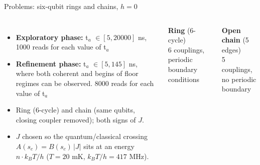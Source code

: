\documentclass[aspectratio=169,11pt]{beamer}
\begin{document}
\begin{frame}{Problems: six-qubit rings and chains, $h=0$}
  \begin{columns}[T]
    \begin{itemize}
    \item \textbf{Exploratory phase:} t$_a$ $\in [5,20000]$ ns, 1000 reads for each value of t$_a$
    \item \textbf{Refinement phase:} t$_a$ $\in [5,145]$ ns, where both coherent and begins of floor regimes can be observed. 8000 reads for each value of t$_a$ 
      \item Ring (6-cycle) and chain (same qubits, closing coupler removed); both signs of $J$.
      \item $J$ chosen so the quantum/classical crossing $A(s_c)=B(s_c)\,|J|$ sits at an energy
            $n\cdot k_BT/h$ ($T=20$ mK, $k_BT/h=417$ MHz).
    \end{itemize}
     \centering
      \vspace{4pt}
      \textbf{Ring} (6-cycle)\\
      \footnotesize 6 couplings, periodic boundary conditions
 
      \vspace{4pt}
      \textbf{Open chain} (5 edges)\\
      \footnotesize 5 couplings, no periodic boundary
  \end{columns}
\end{frame}
\end{document}
